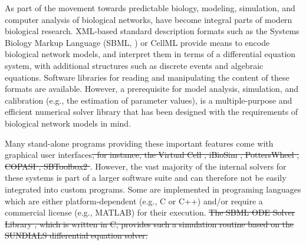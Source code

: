 \documentclass{bioinfo}
\begin{document}
As part of the movement towards predictable biology, modeling, 
simulation, and computer analysis of biological networks, have become integral
parts of modern biological research. XML-based standard description formats
such as the Systems Biology Markup Language (SBML, \citealt{Hucka2003}) or
CellML \citep{Lloyd2004} provide means to encode biological network models, and interpret them in terms of a differential equation system, with
additional structures such as discrete events and algebraic equations.
Software libraries for reading and manipulating the content of
these formats are available.
However, a prerequisite for model analysis, simulation, and calibration (e.g., the
estimation of parameter values), is a multiple-purpose and 
efficient numerical solver library that has been designed with the
requirements of biological network models in mind.

Many stand-alone programs providing these important features come with graphical user interfaces\sout{, for
instance, the Virtual Cell \citep{Loew2001}, iBioSim \citep{Myers2009},
PottersWheel \citep{Maiwald2008}, COPASI \citep{Hoops2006}, SBToolbox2
\citep{SBT_Schmidt2006}}.
However, the vast majority of the internal solvers for
these systems is part of a larger software suite and can therefore not
be easily integrated into custom programs. Some are implemented in programing
languages which are either platform-dependent (e.g., C or C++) and/or require
a commercial license (e.g., MATLAB\texttrademark{}) for their execution.
%
%
%
\sout{The SBML ODE Solver Library \citep{Machne2006}, which is written in C,
provides such a simulation routine based on the SUNDIALS differential equation
solver.}
\end{document}
